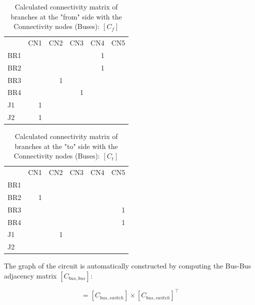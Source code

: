 \documentclass[nols,a4paper,twoside,notoc,fleqn]{tufte-book}
\begin{document}
\begin{table}[h!]
	\begin{tabular}{lrrrrr}
		{} &  CN1 &  CN2 &  CN3 &  CN4 &  CN5 \\
		BR1 &      &      &      &    1 &      \\
		BR2 &      &      &      &    1 &      \\
		BR3 &      &    1 &      &      &      \\
		BR4 &      &      &    1 &      &      \\
		J1  &    1 &      &      &      &      \\
		J2  &    1 &      &      &      &      \\
	\end{tabular}
	\caption{Calculated connectivity matrix of branches at the "from" side with the Connectivity nodes (Buses): $[C_f]$}
\end{table}

\begin{table}[h!]
	\begin{tabular}{lrrrrr}
		{} &  CN1 &  CN2 &  CN3 &  CN4 &  CN5 \\
		BR1 &      &      &      &      &      \\
		BR2 &    1 &      &      &      &      \\
		BR3 &      &      &      &      &    1 \\
		BR4 &      &      &      &      &    1 \\
		J1  &      &    1 &      &      &      \\
		J2  &      &      &      &      &      \\
	\end{tabular}
	\caption{Calculated connectivity matrix of branches at the "to" side with the Connectivity nodes (Buses): $[C_t]$}
\end{table}

\vspace{0.5cm}

The graph of the circuit is automatically constructed by computing the Bus-Bus adjacency matrix  $[C_{bus, bus}]$:

\begin{equation}
	[C_{bus, bus}] = [C_{bus, switch}] \times [C_{bus, switch}]^\top
\end{equation}
\end{document}
